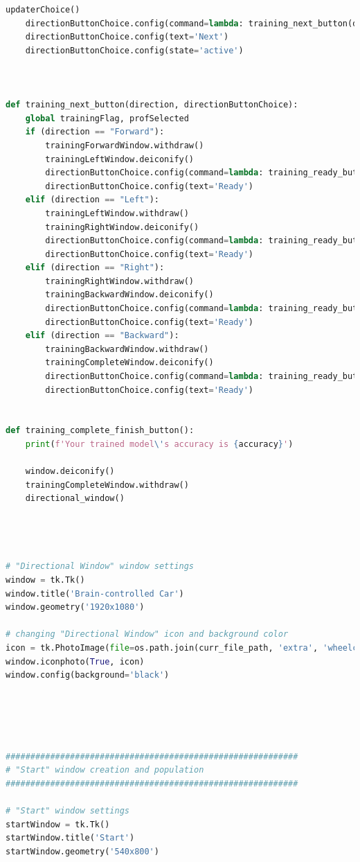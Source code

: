 \documentclass[conference]{IEEEtran}
\begin{document}
\begin{lstlisting}[language=Python, caption=GUI CODE, label=gui_code]
    updaterChoice()
    directionButtonChoice.config(command=lambda: training_next_button(direction,directionButtonChoice))
    directionButtonChoice.config(text='Next')
    directionButtonChoice.config(state='active')



def training_next_button(direction, directionButtonChoice):
    global trainingFlag, profSelected
    if (direction == "Forward"):
        trainingForwardWindow.withdraw()
        trainingLeftWindow.deiconify()
        directionButtonChoice.config(command=lambda: training_ready_button("Forward"))
        directionButtonChoice.config(text='Ready')
    elif (direction == "Left"):
        trainingLeftWindow.withdraw()
        trainingRightWindow.deiconify()
        directionButtonChoice.config(command=lambda: training_ready_button("Left"))
        directionButtonChoice.config(text='Ready')
    elif (direction == "Right"):
        trainingRightWindow.withdraw()
        trainingBackwardWindow.deiconify()
        directionButtonChoice.config(command=lambda: training_ready_button("Right"))
        directionButtonChoice.config(text='Ready')
    elif (direction == "Backward"):
        trainingBackwardWindow.withdraw()
        trainingCompleteWindow.deiconify()                                                        # CHANGE THIS LATER
        directionButtonChoice.config(command=lambda: training_ready_button("Backward"))
        directionButtonChoice.config(text='Ready')


def training_complete_finish_button():
    print(f'Your trained model\'s accuracy is {accuracy}')

    window.deiconify()
    trainingCompleteWindow.withdraw()
    directional_window()




# "Directional Window" window settings
window = tk.Tk()
window.title('Brain-controlled Car')
window.geometry('1920x1080')

# changing "Directional Window" icon and background color
icon = tk.PhotoImage(file=os.path.join(curr_file_path, 'extra', 'wheelchairIcon2.png'))
window.iconphoto(True, icon)
window.config(background='black')





###########################################################
# "Start" window creation and population
###########################################################

# "Start" window settings
startWindow = tk.Tk()
startWindow.title('Start')
startWindow.geometry('540x800')


\end{lstlisting}
\end{document}
